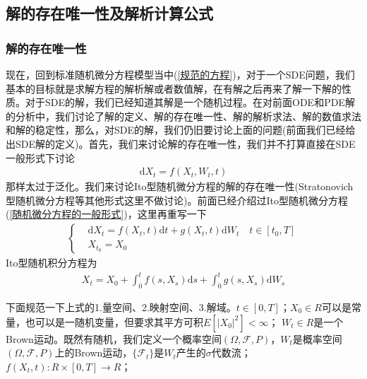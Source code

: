     \subsection{解的存在唯一性及解析计算公式}
        \label{subsec:解的存在唯一性及解析计算公式}
        \subsubsection{解的存在唯一性}
            \label{subsubsec:解的存在唯一性}
            \par
            现在，回到标准随机微分方程模型当中(\ref{规范的方程})，对于一个SDE问题，我们基本的目标就是求解方程的解析解或者数值解，在有解之后再来了解一下解的性质。对于SDE的解，我们已经知道其解是一个随机过程。在对前面ODE和PDE解的分析中，我们讨论了解的定义、解的存在唯一性、解的解析求法、解的数值求法和解的稳定性，那么，对SDE的解，我们仍旧要讨论上面的问题(前面我们已经给出SDE解的定义)。首先，我们来讨论解的存在唯一性，我们并不打算直接在SDE一般形式下讨论
            \begin{align*}
                \mathrm{d}X_t = f(X_t,W_t,t)
            \end{align*}
            那样太过于泛化。我们来讨论Ito型随机微分方程的解的存在唯一性(Stratonovich型随机微分方程等其他形式这里不做讨论)。前面已经介绍过Ito型随机微分方程(\ref{随机微分方程的一般形式})，这里再重写一下
            \begin{align*}
                \left\{
                    \begin{aligned}
                            &\mathrm{d}X_t = f(X_t,t)\mathrm{d}t + g(X_t,t)\mathrm{d}W_t \quad t\in [t_0,T]\\
                            &X_{t_0} = X_0
                    \end{aligned}
                \right.
            \end{align*}
            Ito型随机积分方程为
            \begin{align*}
                X_t = X_0+\int_0^t f(s,X_s)\mathrm{d}s + \int_0^t g(s,X_s)\mathrm{d}W_s
            \end{align*}
            \par
            下面规范一下上式的1.量空间、2.映射空间、3.解域。$t\in [0,T]$；$X_0\in R$可以是常量，也可以是一随机变量，但要求其平方可积$E[|X_0|^2]<\infty$；
            $W_t\in R$是一个Brown运动。既然有随机，我们定义一个概率空间$(\Omega,\mathcal{F},P)$，$W_t$是概率空间$(\Omega,\mathcal{F},P)$上的Brown运动，$\{\mathcal{F}_t\}$是$W_t$产生的$\sigma$代数流；
            $f(X_t,t):R\times [0,T] \rightarrow R$；
